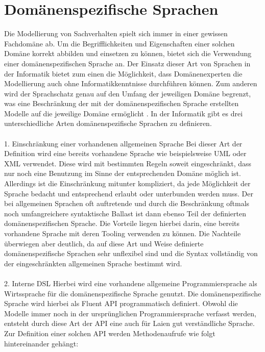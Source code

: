 \documentclass[11pt,a4paper,bibtotocnumbered]{scrreprt}
\begin{document}
\section{Domänenspezifische Sprachen}
Die Modellierung von Sachverhalten spielt sich immer in einer gewissen Fachdomäne ab. Um die Begrifflichkeiten und Eigenschaften einer solchen Domäne korrekt abbilden und einsetzen zu können, bietet sich die Verwendung einer domänenspezifischen Sprache an. Der Einsatz dieser Art von Sprachen in der Informatik bietet zum einen die Möglichkeit, dass Domänenexperten die Modellierung auch ohne Informatikkenntnisse durchführen können. Zum anderen wird der Sprachschatz genau auf den Umfang der jeweiligen Domäne begrenzt, was eine Beschränkung der mit der domänenspezifischen Sprache erstellten Modelle auf die jeweilige Domäne ermöglicht \cite{FowlerDSL}.
In der Informatik gibt es drei unterschiedliche Arten domänenspezifische Sprachen zu definieren.
\\
\\
1. Einschränkung einer vorhandenen allgemeinen Sprache
Bei dieser Art der Definition wird eine bereits vorhandene Sprache wie beispielsweise UML oder XML verwendet. Diese wird mit bestimmten Regeln soweit eingeschränkt, dass nur noch eine Benutzung im Sinne der entsprechenden Domäne möglich ist. Allerdings ist die Einschränkung mitunter kompliziert, da jede Möglichkeit der Sprache bedacht und entsprechend erlaubt oder unterbunden werden muss. Der bei allgemeinen Sprachen oft auftretende und durch die Beschränkung oftmals noch umfangreichere syntaktische Ballast ist dann ebenso Teil der definierten domänenspezifischen Sprache. Die Vorteile liegen hierbei darin, eine bereits vorhandene Sprache mit deren Tooling verwenden zu können. Die Nachteile überwiegen aber deutlich, da auf diese Art und Weise definierte domänenspezifische Sprachen sehr unflexibel sind und die Syntax vollständig von der eingeschränkten allgemeinen Sprache bestimmt wird.
\\
\\
2. Interne DSL
Hierbei wird eine vorhandene allgemeine Programmiersprache als Wirtssprache für die domänenspezifische Sprache genutzt. Die domänenspezifische Sprache wird hierbei als Fluent API programmatisch definiert. Obwohl die Modelle immer noch in der ursprünglichen Programmiersprache verfasst werden, entsteht durch diese Art der API eine auch für Laien gut verständliche Sprache. Zur Definition einer solchen API werden Methodenaufrufe wie folgt hintereinander gehängt:
\\
\\
\end{document}
